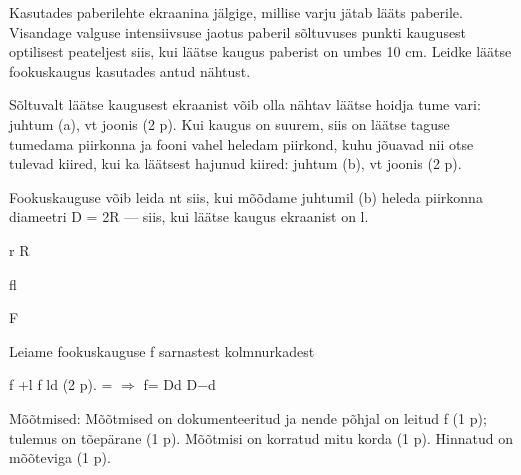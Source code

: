 
Kasutades paberilehte ekraanina jälgige, millise varju jätab lääts paberile. Visandage valguse intensiivsuse jaotus paberil sõltuvuses punkti kaugusest optilisest peateljest siis, kui läätse kaugus paberist on umbes 10 cm. Leidke läätse fookuskaugus kasutades antud nähtust.

\hint

\solu
Sõltuvalt läätse kaugusest ekraanist võib olla nähtav läätse hoidja tume vari: juhtum (a), vt joonis (2 p). Kui kaugus on suurem, siis on läätse taguse tumedama piirkonna ja fooni vahel heledam piirkond, kuhu jõuavad nii otse tulevad kiired, kui ka läätsest hajunud kiired: juhtum (b), vt joonis (2 p).

Fookuskauguse võib leida nt siis, kui mõõdame juhtumil (b) heleda piirkonna diameetri D = 2R --- siis, kui läätse kaugus ekraanist on l.

r R

fl

F

Leiame fookuskauguse f sarnastest kolmnurkadest

f +l f ld (2 p). = $\Rightarrow$ f= Dd D$-$d

Mõõtmised: Mõõtmised on dokumenteeritud ja nende põhjal on leitud f (1 p); tulemus on tõepärane (1 p). Mõõtmisi on korratud mitu korda (1 p). Hinnatud on mõõteviga (1 p).
\probend
